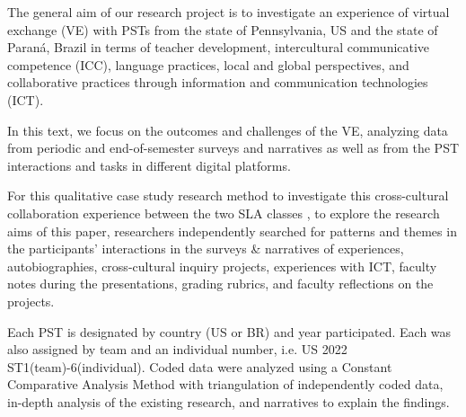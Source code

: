 The general aim of our research project is to investigate an experience
of virtual exchange (VE) with PSTs from the state of Pennsylvania, US
and the state of Paraná, Brazil in terms of teacher development,
intercultural communicative competence (ICC), language practices, local
and global perspectives, and collaborative practices through information
and communication technologies (ICT).

In this text, we focus on the outcomes and challenges of the VE,
analyzing data from periodic and end-of-semester surveys and narratives
as well as from the PST interactions and tasks in different digital
platforms.

For this qualitative case study research method to investigate this
cross-cultural collaboration experience between the two SLA classes
\cite{stake2005qualitative}, to explore the research aims of this paper, researchers
independently searched for patterns and themes in the
participants’ interactions in the surveys \& narratives
of experiences, autobiographies, cross-cultural inquiry projects,
experiences with ICT, faculty notes during the presentations, grading
rubrics, and faculty reflections on the projects.

Each PST is designated by country (US or BR) and year participated. Each
was also assigned by team and an individual number, i.e. US 2022
ST1(team)-6(individual). Coded data were analyzed using a Constant
Comparative Analysis Method \cite{glaser1967discovery} with triangulation
\cite{denzin2000discipline} of independently coded data, in-depth analysis
of the existing research, and narratives to explain the findings.
		
		
		
		
